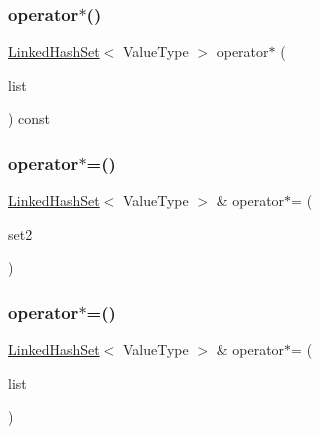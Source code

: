 \subsubsection{\texorpdfstring{operator$\ast$()}{operator*()}\hspace{0.1cm}{\footnotesize\ttfamily [2/2]}}
{\footnotesize\ttfamily \mbox{\hyperlink{classLinkedHashSet}{Linked\+Hash\+Set}}$<$ Value\+Type $>$ operator$\ast$ (\begin{DoxyParamCaption}\item[{std\+::initializer\+\_\+list$<$ Value\+Type $>$}]{list }\end{DoxyParamCaption}) const}

\mbox{\label{classLinkedHashSet_a7c5fd07c05ab45a7e2c8e0ca849586da}} 
\subsubsection{\texorpdfstring{operator$\ast$=()}{operator*=()}\hspace{0.1cm}{\footnotesize\ttfamily [1/2]}}
{\footnotesize\ttfamily \mbox{\hyperlink{classLinkedHashSet}{Linked\+Hash\+Set}}$<$ Value\+Type $>$ \& operator$\ast$= (\begin{DoxyParamCaption}\item[{const \mbox{\hyperlink{classLinkedHashSet}{Linked\+Hash\+Set}}$<$ Value\+Type $>$ \&}]{set2 }\end{DoxyParamCaption})}

\mbox{\label{classLinkedHashSet_a73d1c803748d3463091eeeb699f51d02}} 
\subsubsection{\texorpdfstring{operator$\ast$=()}{operator*=()}\hspace{0.1cm}{\footnotesize\ttfamily [2/2]}}
{\footnotesize\ttfamily \mbox{\hyperlink{classLinkedHashSet}{Linked\+Hash\+Set}}$<$ Value\+Type $>$ \& operator$\ast$= (\begin{DoxyParamCaption}\item[{std\+::initializer\+\_\+list$<$ Value\+Type $>$}]{list }\end{DoxyParamCaption})}


